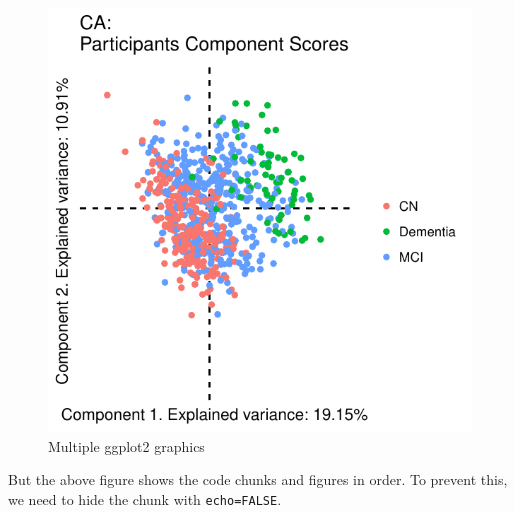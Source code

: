\documentclass[]{article}
\begin{document}
\begin{figure}[H]

{\centering \includegraphics{1_b_Simple_RMarkdown_PDF_files/figure-latex/unnamed-chunk-1-2} 

}

\caption{Multiple ggplot2 graphics}\label{fig:unnamed-chunk-12}
\end{figure}

But the above figure shows the code chunks and figures in order. To
prevent this, we need to hide the chunk with \texttt{echo=FALSE}.
\end{document}
